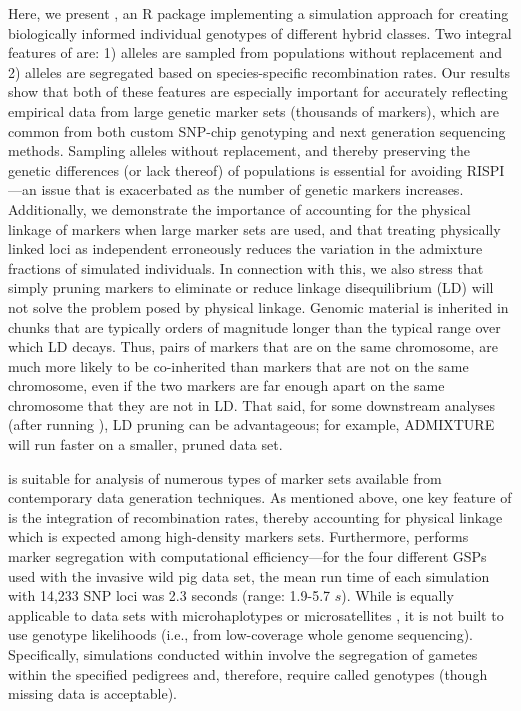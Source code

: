 {Here, we present \gscramble{}, an R package implementing a simulation
approach for creating biologically informed individual 
genotypes of different hybrid classes. Two integral features of \gscramble{} are: 
1) alleles are sampled from populations without replacement and 
2) alleles are segregated based on species-specific recombination rates. 
Our results show that both 
of these features are especially important for accurately reflecting empirical data from large genetic 
marker sets (thousands of markers), 
which are common from both custom SNP-chip genotyping and next generation sequencing methods. Sampling alleles without 
replacement, and thereby preserving the genetic differences (or lack thereof) of populations is 
essential for avoiding RISPI---an issue that is exacerbated as the number of 
genetic markers increases. Additionally, we demonstrate the importance of accounting for 
the physical linkage of markers when large marker sets are used, and that treating physically linked loci as 
independent erroneously reduces the variation in the admixture 
fractions of simulated individuals.  In connection with this, we also stress that simply
pruning markers to eliminate or reduce linkage disequilibrium (LD)
will not solve the problem posed by physical linkage.
Genomic material is inherited in chunks that are typically orders of magnitude longer than
the typical range over which LD decays.  Thus, pairs of markers that are
on the same chromosome, are much more likely to be co-inherited than markers that
are not on the same chromosome, even if the two markers are far enough apart on the
same chromosome that they are not in LD.  That said, for some downstream analyses (after
running \gscramble{}),  LD pruning can be advantageous; for example, ADMIXTURE will run faster on a smaller, pruned data set.

\gscramble{} is suitable for analysis of numerous types of marker sets available from contemporary data generation 
techniques. As mentioned above, 
one key feature of \gscramble{} is the integration of recombination rates, thereby accounting for physical 
linkage which is expected among high-density markers sets. Furthermore, \gscramble{} performs marker 
segregation with computational efficiency---for the four different GSPs used with the invasive wild pig data set, 
the mean run time of each simulation with 14,233 SNP loci was 2.3 seconds (range: 1.9-5.7 $s$). 
While \gscramble{} is equally applicable to data sets with 
microhaplotypes \citep{baetscher2018microhaplotypes} or microsatellites \citep{zhan2017megasat}, 
it is not built to use genotype likelihoods (i.e., from low-coverage whole genome sequencing). 
Specifically, simulations conducted within \gscramble{} involve the segregation of gametes within the 
specified pedigrees and, therefore, require called genotypes (though missing data is acceptable). 

}
